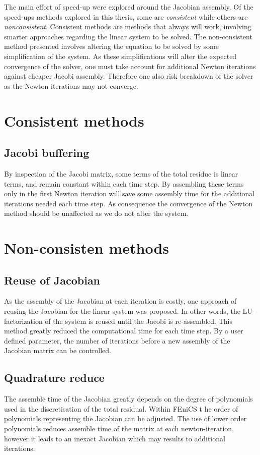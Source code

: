 The main effort of speed-up were explored around the Jacobian assembly.
Of the speed-ups methods explored in this thesis, some are \textit{consistent} while others are \textit{nonconsistent}. Consistent methods are methods that always will work, involving smarter approaches regarding the linear system to be solved. The non-consistent method presented involves altering the equation to be solved by some simplification of the system. As these simplifications will alter the expected convergence of the solver, one must take account for additional Newton iterations against cheaper Jacobi assembly. Therefore one also risk breakdown of the solver as the Newton iterations may not converge.   


\section{Consistent methods}
\subsection{Jacobi buffering}
By inspection of the Jacobi matrix, some terms of the total residue is linear terms, and remain constant within each time step. By assembling these terms only in the first Newton iteration will save some assembly time for the additional iterations needed each time step. As consequence the convergence of the Newton method should be unaffected as we do not alter the system.  

\section{Non-consisten methods}    
\subsection{Reuse of Jacobian}
As the assembly of the Jacobian at each iteration is costly, one approach of reusing the Jacobian for the linear system was proposed. In other words, the LU-factorization of the system is reused until the Jacobi is re-assembled. This method greatly reduced the computational time for each time step. By a user defined parameter, the number of iterations before a new assembly of the Jacobian matrix can be controlled. 

\subsection{Quadrature reduce}
The assemble time of the Jacobian greatly depends on the degree of polynomials used in the discretisation of the total residual. Within FEniCS t he order of polynomials representing the Jacobian can be adjusted. The use of lower order polynomials reduces assemble time of the matrix at each newton-iteration, however it leads to an inexact Jacobian which may results to additional iterations. 


